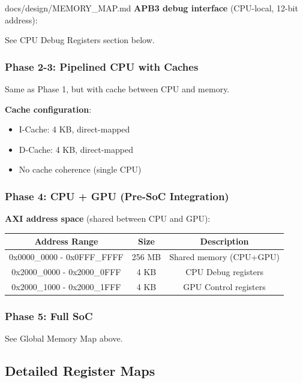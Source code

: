 \begin{relocated}{docs/design/MEMORY_MAP.md}
\textbf{APB3 debug interface} (CPU-local, 12-bit address):

See CPU Debug Registers section below.

\subsubsection{Phase 2-3: Pipelined CPU with Caches}\label{ds:mm:memory-map:phase-2-3-pipelined-cpu-with-caches}

Same as Phase 1, but with cache between CPU and memory.

\textbf{Cache configuration}:

\begin{itemize}
\tightlist
\item
  I-Cache: 4 KB, direct-mapped
\item
  D-Cache: 4 KB, direct-mapped
\item
  No cache coherence (single CPU)
\end{itemize}

\subsubsection{Phase 4: CPU + GPU (Pre-SoC Integration)}\label{ds:mm:memory-map:phase-4-cpu-gpu-pre-soc-integration}

\textbf{AXI address space} (shared between CPU and GPU):

{
\begin{longtable}[]{@{}ccc@{}}
\toprule\noalign{}
Address Range & Size & Description \\
\midrule\noalign{}
\endhead
\bottomrule\noalign{}
\endlastfoot
0x0000\_\allowbreak{}0000 - 0x0FFF\_\allowbreak{}FFFF & 256 MB & Shared
memory (CPU+GPU) \\
0x2000\_\allowbreak{}0000 - 0x2000\_\allowbreak{}0FFF & 4 KB & CPU Debug
registers \\
0x2000\_\allowbreak{}1000 - 0x2000\_\allowbreak{}1FFF & 4 KB & GPU
Control registers \\
\end{longtable}
}

\subsubsection{Phase 5: Full SoC}\label{ds:mm:memory-map:phase-5-full-soc}

See Global Memory Map above.

\subsection{Detailed Register Maps}\label{ds:mm:memory-map:detailed-register-maps}


\end{relocated}
